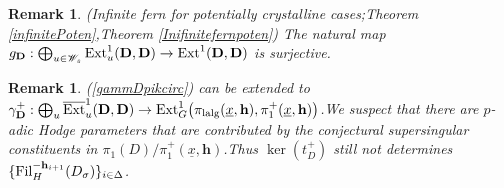 \documentclass[10pt]{article}
\newtheorem{rmk}[thm]{Remark}
\newcommand{\fil}{{\rm Fil}}
\newcommand{\ext}{{\rm Ext}}
\newcommand{\lalg}{{\rm lalg}}
\newcommand{\Dpik}{{\mathbf{D}}}
\newcommand{\bh}{{\mathbf{h}}}
\newcommand{\sW}{\mathscr W}
\begin{document}
\begin{rmk}\label{rmkintroIII}(Infinite fern for potentially crystalline cases;\;Theorem \ref{infinitePoten},\;Theorem \ref{Inifinitefernpoten}) The natural map $g_{\Dpik}:\bigoplus_{u\in \sW_{s}}{\ext}^{1}_{u}(\Dpik,\Dpik)\rightarrow {\ext}^1(\Dpik,\Dpik)$  is surjective.\;
\end{rmk}

\begin{rmk}\label{expectintro}
  (\ref{gammDpikcirc}) can be extended  to $\gamma^+_{\Dpik}:\bigoplus\nolimits_{u}\overline{\ext}^{1}_{u}(\Dpik,\Dpik)\rightarrow\ext^1_{G}\big(\pi_{\lalg}(\underline{x},\bh),\pi^+_{1}(\underline{x},\bh)\big)$.\;We  suspect that there are $p$-adic Hodge parameters that are contributed by the conjectural supersingular constituents in $\pi_1(D)/\pi^+_{1}(\underline{x},\bh)$.\;Thus  $\ker({t}^{+}_{D})$ still not determines $\{\fil_H^{-\bh_{i+1}}(D_{\sigma})\}_{i\in \Delta}$.\;
\end{rmk}
\end{document}
